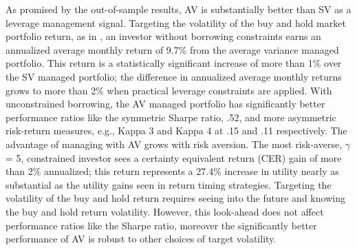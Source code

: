 As promised by the out-of-sample results, AV is substantially better than SV as a leverage management signal. Targeting the volatility of the buy and hold market portfolio return, as in \citet{moreira_volatility-managed_2017}, an investor without borrowing constraints earns an annualized average monthly return of 9.7\% from the average variance managed portfolio. This return is a statistically significant increase of more than 1\% over the SV managed portfolio; the difference in annualized average monthly returns grows to more than 2\% when practical leverage constraints are applied. With unconstrained borrowing, the AV managed portfolio has significantly better performance ratios like the symmetric Sharpe ratio, .52, and more asymmetric risk-return measures, e.g., Kappa 3 and Kappa 4 at .15 and .11 respectively. The advantage of managing with AV grows with risk aversion. The most risk-averse, $\gamma$ = 5, constrained investor sees a certainty equivalent return (CER) gain of more than 2\% annualized; this return represents a 27.4\% increase in utility nearly as substantial as the utility gains seen in return timing strategies. \citep{campbell1997econometrics} Targeting the volatility of the buy and hold return requires seeing into the future and knowing the buy and hold return volatility. However, this look-ahead does not affect performance ratios like the Sharpe ratio, moreover the significantly better performance of AV is robust to other choices of target volatility. 

